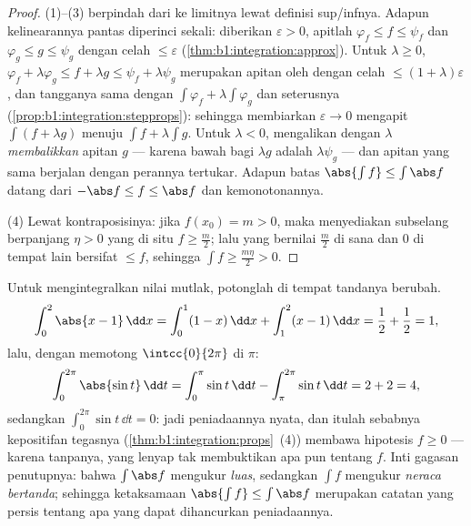 \begin{proof}
(1)--(3) berpindah dari  ke limitnya lewat
definisi sup/infnya. Adapun kelinearannya pantas diperinci sekali: diberikan
$\varepsilon > 0$, apitlah $\varphi_f \leq f \leq \psi_f$ dan
$\varphi_g \leq g \leq \psi_g$ dengan celah $\leq \varepsilon$
(\cref{thm:b1:integration:approx}). Untuk $\lambda \geq 0$,
$\varphi_f + \lambda\varphi_g \leq f + \lambda g \leq \psi_f +
\lambda\psi_g$ merupakan apitan oleh  dengan celah $\leq
(1 + \lambda)\varepsilon$, dan  tangganya sama dengan $\int
\varphi_f + \lambda\int\varphi_g$ dan seterusnya
(\cref{prop:b1:integration:stepprops}): sehingga membiarkan $\varepsilon \to
0$ mengapit $\int(f + \lambda g)$ menuju $\int f + \lambda\int g$.
Untuk $\lambda < 0$, mengalikan dengan $\lambda$ \emph{membalikkan}
apitan $g$ --- karena  bawah bagi $\lambda g$ adalah
$\lambda \psi_g$ --- dan apitan yang sama berjalan dengan perannya
tertukar. Adapun batas $\abs{\int f} \leq \int \abs f$ datang dari
$-\abs f \leq f \leq \abs f$ dan kemonotonannya.

(4) Lewat kontraposisinya: jika $f(x_0) = m > 0$, maka  menyediakan
subselang berpanjang $\eta > 0$ yang di situ $f \geq \frac m2$; lalu
 yang bernilai $\frac m2$ di sana dan $0$ di tempat lain bersifat $\leq f$,
sehingga $\int f \geq \frac{m\eta}{2} > 0$.
\end{proof}

\begin{example}\label{ex:b1:integration:chasleswork}
Untuk mengintegralkan nilai mutlak, potonglah di tempat tandanya berubah.
\[
\int_0^2 \abs{x - 1}\,\dd x
= \int_0^1 (1 - x)\,\dd x + \int_1^2 (x - 1)\,\dd x
= \frac12 + \frac12 = 1 ,
\]
lalu, dengan memotong $\intcc{0}{2\pi}$ di $\pi$:
\[
\int_0^{2\pi} \abs{\sin t}\,\dd t
= \int_0^{\pi} \sin t\,\dd t - \int_{\pi}^{2\pi} \sin t\,\dd t
= 2 + 2 = 4 ,
\]
sedangkan $\int_0^{2\pi} \sin t\,\dd t = 0$: jadi peniadaannya nyata,
dan itulah sebabnya  kepositifan tegasnya
(\cref{thm:b1:integration:props}~(4)) membawa hipotesis $f
\geq 0$ --- karena tanpanya,  yang lenyap tak membuktikan apa pun
tentang $f$. Inti gagasan penutupnya: bahwa $\int \abs f$ mengukur
\emph{luas}, sedangkan $\int f$ mengukur \emph{neraca bertanda}; sehingga
ketaksamaan $\abs{\int f} \leq \int\abs f$ merupakan catatan yang persis tentang
apa yang dapat dihancurkan peniadaannya.
\end{example}


